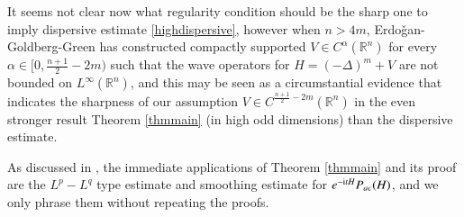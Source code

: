 \documentclass[11pt,reqno]{amsart}
\def\i{{\rm i}}
\numberwithin{equation}{section}
\theoremstyle{definition}
\begin{document}
It seems not clear now  what regularity condition should be the sharp one to imply dispersive estimate \eqref{highdispersive}, however when $n>4m$, Erdo\v{g}an-Goldberg-Green \cite{EGG23} has constructed compactly supported $V\in C^\alpha(\mathbb{R}^n)$ for every $\alpha\in[0,\frac{n+1}{2}-2m)$ such that the wave operators for $H=(-\Delta)^m+V$ are not bounded on $L^\infty(\mathbb{R}^n)$, and this may be seen as a circumstantial evidence that indicates the sharpness of our assumption $V\in C^{\frac{n+1}{2}-2m}(\mathbb{R}^n)$ in the even stronger result Theorem \ref{thmmain} (in high odd dimensions) than the dispersive estimate. 

As discussed in \cite{CHHZ}, the immediate applications of Theorem \ref{thmmain} and its proof are the $L^p-L^q$ type estimate and smoothing estimate for $e^{-\i tH}P_{ac}(H)$, and we only phrase them without repeating the proofs.
\end{document}
